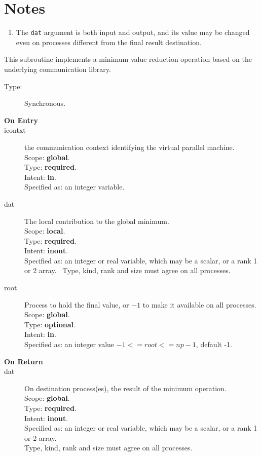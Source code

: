 \section*{Notes}
\begin{enumerate}
\item The \verb|dat| argument is both input and output, and its
  value may be changed even on processes different from the final
  result destination.
\end{enumerate}



This subroutine implements a minimum value reduction
operation based on the underlying communication library. 
\begin{description}
\item[Type:] Synchronous.
\item[\bf  On Entry ]
\item[icontxt] the communication context identifying the virtual
  parallel machine.\\
Scope: {\bf global}.\\
Type: {\bf required}.\\
Intent: {\bf in}.\\
Specified as: an integer variable.
\item[dat] The local contribution to the global minimum.\\
Scope: {\bf local}.\\
Type: {\bf required}.\\
Intent: {\bf inout}.\\
Specified as: an integer  or real variable, which may be a
scalar, or a rank 1 or 2 array. \
Type, kind, rank and size must agree on all processes.
\item[root] Process to hold the final value, or $-1$ to make it available
  on all processes.\\
Scope: {\bf global}.\\
Type: {\bf optional}.\\
Intent: {\bf in}.\\
Specified as: an integer value $-1<= root <= np-1$, default -1. \\
\end{description}


\begin{description}
\item[\bf On Return]
\item[dat] On destination process(es), the result of the minimum operation.\\
Scope: {\bf global}.\\
Type: {\bf required}.\\
Intent: {\bf inout}.\\
Specified as: an integer  or  real variable, which may be a
scalar, or a rank 1 or 2 array. \\
Type, kind, rank and size must agree on all processes.
\end{description}


